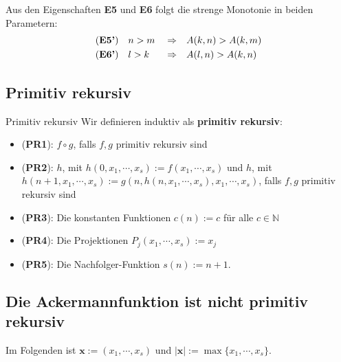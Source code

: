 \documentclass[a4paper]{amsart}
\theoremstyle{definition}
\newcommand{\N}{\ensuremath{\mathbb{ N }}}
\newcommand{\bb}[1]{\mathbf{#1}}
\begin{document}
Aus den Eigenschaften \textbf{E5} und \textbf{E6} folgt die strenge Monotonie in beiden Parametern:
\begin{align*}
    &\text{(\textbf{E5'})} && n >  m &&\Rightarrow &&A( k, n )  > A( k, m )\\
    &\text{(\textbf{E6'})} && l >  k &&\Rightarrow &&A( l, n )  > A( k, n )
\end{align*}


\subsection{Primitiv rekursiv}

\begin{Definition}{Primitiv rekursiv}
    Wir definieren induktiv als \textbf{primitiv rekursiv}:
    
    \begin{itemize}
        \item (\textbf{PR1}): $f \circ g$, falls $f,g$ primitiv rekursiv sind
        \item (\textbf{PR2}): $h$, mit $h( 0, x_1, \cdots, x_s ) := f( x_1, \cdots, x_s )$ und
            $h$, mit $h( n+1, x_1, \cdots, x_s ) := g(n, h( n, x_1, \cdots, x_s ), x_1, \cdots, x_s)$,
             falls $f,g$ primitiv rekursiv sind 
        \item (\textbf{PR3}): Die konstanten Funktionen $c(n) := c$ für alle $c \in \N$ 
        \item (\textbf{PR4}): Die Projektionen $P_j(x_1, \cdots, x_s ) := x_j$
        \item (\textbf{PR5}): Die Nachfolger-Funktion $s(n) := n+1$.
    \end{itemize}
\end{Definition}

\subsection{Die Ackermannfunktion ist nicht primitiv rekursiv}
Im Folgenden ist $\bb{x} := (x_1, \cdots, x_s)$ und $|\bb{x}| := \max \{x_1, \cdots, x_s \}$.
\end{document}
